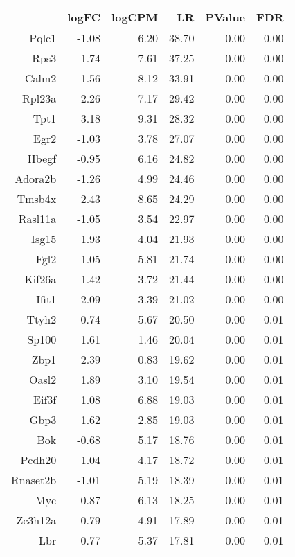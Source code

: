 \begin{table}[ht]
\centering
\begin{tabular}{rrrrrr}
  \hline
 & logFC & logCPM & LR & PValue & FDR \\ 
  \hline
Pqlc1 & -1.08 & 6.20 & 38.70 & 0.00 & 0.00 \\ 
  Rps3 & 1.74 & 7.61 & 37.25 & 0.00 & 0.00 \\ 
  Calm2 & 1.56 & 8.12 & 33.91 & 0.00 & 0.00 \\ 
  Rpl23a & 2.26 & 7.17 & 29.42 & 0.00 & 0.00 \\ 
  Tpt1 & 3.18 & 9.31 & 28.32 & 0.00 & 0.00 \\ 
  Egr2 & -1.03 & 3.78 & 27.07 & 0.00 & 0.00 \\ 
  Hbegf & -0.95 & 6.16 & 24.82 & 0.00 & 0.00 \\ 
  Adora2b & -1.26 & 4.99 & 24.46 & 0.00 & 0.00 \\ 
  Tmsb4x & 2.43 & 8.65 & 24.29 & 0.00 & 0.00 \\ 
  Rasl11a & -1.05 & 3.54 & 22.97 & 0.00 & 0.00 \\ 
  Isg15 & 1.93 & 4.04 & 21.93 & 0.00 & 0.00 \\ 
  Fgl2 & 1.05 & 5.81 & 21.74 & 0.00 & 0.00 \\ 
  Kif26a & 1.42 & 3.72 & 21.44 & 0.00 & 0.00 \\ 
  Ifit1 & 2.09 & 3.39 & 21.02 & 0.00 & 0.00 \\ 
  Ttyh2 & -0.74 & 5.67 & 20.50 & 0.00 & 0.01 \\ 
  Sp100 & 1.61 & 1.46 & 20.04 & 0.00 & 0.01 \\ 
  Zbp1 & 2.39 & 0.83 & 19.62 & 0.00 & 0.01 \\ 
  Oasl2 & 1.89 & 3.10 & 19.54 & 0.00 & 0.01 \\ 
  Eif3f & 1.08 & 6.88 & 19.03 & 0.00 & 0.01 \\ 
  Gbp3 & 1.62 & 2.85 & 19.03 & 0.00 & 0.01 \\ 
  Bok & -0.68 & 5.17 & 18.76 & 0.00 & 0.01 \\ 
  Pcdh20 & 1.04 & 4.17 & 18.72 & 0.00 & 0.01 \\ 
  Rnaset2b & -1.01 & 5.19 & 18.39 & 0.00 & 0.01 \\ 
  Myc & -0.87 & 6.13 & 18.25 & 0.00 & 0.01 \\ 
  Zc3h12a & -0.79 & 4.91 & 17.89 & 0.00 & 0.01 \\ 
  Lbr & -0.77 & 5.37 & 17.81 & 0.00 & 0.01 \\ 

\end{tabular}
\end{table}
